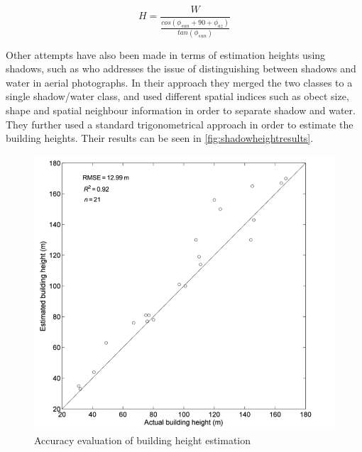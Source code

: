 \begin{equation}
	H=\frac{W}{\frac{cos(\phi_{sun}+90+\phi_{az})}{tan(\phi_{sun})}}
	\label{eq:shadowheight}
\end{equation}

Other attempts have also been made in terms of estimation heights using shadows, such as \cite{Shao2011} who addresses the issue of distinguishing between shadows and water in aerial photographs. In their approach they merged the two classes to a single shadow/water class, and used different spatial indices such as obect size, shape and spatial neighbour information in order to separate shadow and water. They further used a standard trigonometrical approach in order to estimate the building heights. Their results can be seen in \autoref{fig:shadowheightresults}.

\begin{figure}[!h]
	\centering
	\includegraphics[scale=0.4]{fig/shadow_height_results.png}
	\caption{Accuracy evaluation of building height estimation \citep{Shao2011}}
	\label{fig:shadowheightresults}
\end{figure}